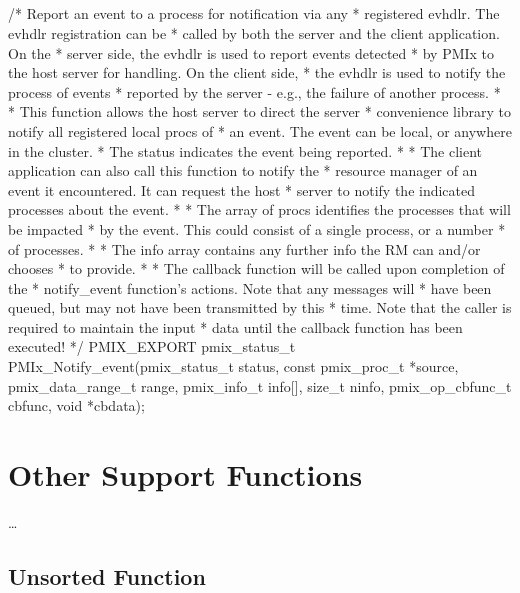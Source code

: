 \subsection{}

\cspecificstart
\begin{codepar}
/* Report an event to a process for notification via any
 * registered evhdlr. The evhdlr registration can be
 * called by both the server and the client application. On the
 * server side, the evhdlr is used to report events detected
 * by PMIx to the host server for handling. On the client side,
 * the evhdlr is used to notify the process of events
 * reported by the server - e.g., the failure of another process.
 *
 * This function allows the host server to direct the server
 * convenience library to notify all registered local procs of
 * an event. The event can be local, or anywhere in the cluster.
 * The status indicates the event being reported.
 *
 * The client application can also call this function to notify the
 * resource manager of an event it encountered. It can request the host
 * server to notify the indicated processes about the event.
 *
 * The array of procs identifies the processes that will be impacted
 * by the event. This could consist of a single process, or a number
 * of processes.
 *
 * The info array contains any further info the RM can and/or chooses
 * to provide.
 *
 * The callback function will be called upon completion of the
 * notify_event function's actions. Note that any messages will
 * have been queued, but may not have been transmitted by this
 * time. Note that the caller is required to maintain the input
 * data until the callback function has been executed!
*/
PMIX_EXPORT pmix_status_t PMIx_Notify_event(pmix_status_t status,
                                            const pmix_proc_t *source,
                                            pmix_data_range_t range,
                                            pmix_info_t info[], size_t ninfo,
                                            pmix_op_cbfunc_t cbfunc, void *cbdata);
\end{codepar}
\cspecificend


\section{Other Support Functions}

\ldots

\subsection{Unsorted Function}

